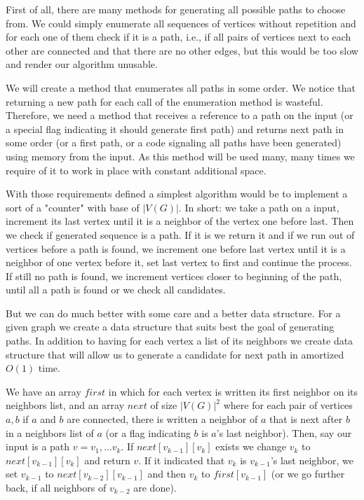 First of all, there are many methods for generating all possible paths to choose from. We could simply enumerate all sequences of vertices without repetition and for each one of them check if it is a path, i.e., if all pairs of vertices next to each other are connected and that there are no other edges, but this would be too slow and render our algorithm unusable.

We will create a method that enumerates all paths in some order. We notice that returning a new path for each call of the enumeration method is wasteful. Therefore, we need a method that receives a reference to a path on the input (or a special flag indicating it should generate first path) and returns next path in some order (or a first path, or a code signaling all paths have been generated) using memory from the input. As this method will be used many, many times we require of it to work in place with constant additional space.

With those requirements defined a simplest algorithm would be to implement a sort of a "counter" with base of $|V(G)|$. In short: we take a path on a input, increment its last vertex until it is a neighbor of the vertex one before last. Then we check if generated sequence is a path. If it is we return it and if we run out of vertices before a path is found, we increment one before last vertex until it is a neighbor of one vertex before it, set last vertex to first and continue the process. If still no path is found, we increment vertices closer to beginning of the path, until all a path is found or we check all candidates.

But we can do much better with some care and a better data structure. For a given graph we create a data structure that suits best the goal of generating paths. In addition to having for each vertex a list of its neighbors we create data structure that will allow us to generate a candidate for next path in amortized $O(1)$ time.

We have an array $first$ in which for each vertex is written its first neighbor on its neighbors list, and an array $next$ of size $|V(G)|^2$ where for each pair of vertices $a, b$ if $a$ and $b$ are connected, there is written a neighbor of $a$ that is next after $b$ in a neighbors list of $a$ (or a flag indicating $b$ is $a$'s last neighbor). Then, say our input is a path $v = v_1, \ldots v_k$. If $next[v_{k-1}][v_k]$ exists we change $v_k$ to $next[v_{k-1}][v_k]$ and return $v$. If it indicated that $v_k$ is $v_{k-1}$'s last neighbor, we set $v_{k-1}$ to $next[v_{k-2}][v_{k-1}]$ and then $v_k$ to $first[v_{k-1}]$ (or we go further back, if all neighbors of $v_{k-2}$ are done).

